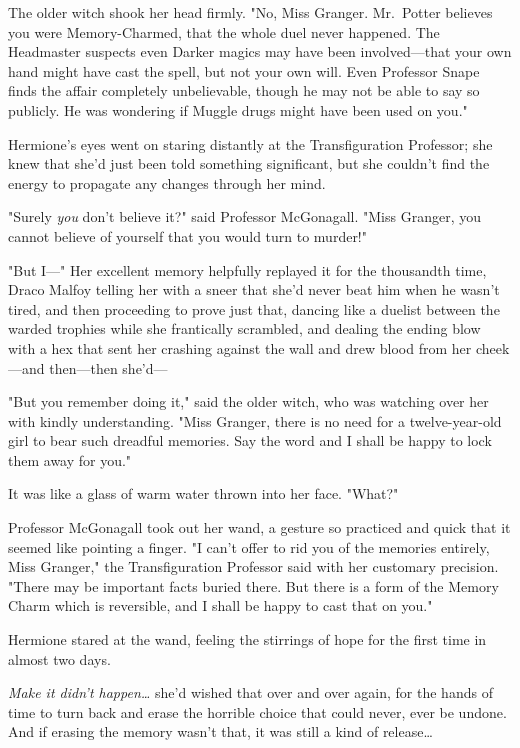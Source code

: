 The older witch shook her head firmly. "No, Miss Granger. Mr.~Potter believes 
you were Memory-Charmed, that the whole duel never happened. The Headmaster 
suspects even Darker magics may have been involved---that your own hand might 
have cast the spell, but not your own will. Even Professor Snape finds the 
affair completely unbelievable, though he may not be able to say so publicly. 
He was wondering if Muggle drugs might have been used on you."

Hermione's eyes went on staring distantly at the Transfiguration Professor; she 
knew that she'd just been told something significant, but she couldn't find the 
energy to propagate any changes through her mind.

"Surely \emph{you} don't believe it?" said Professor McGonagall. "Miss Granger, 
you cannot believe of yourself that you would turn to murder!"

"But I---" Her excellent memory helpfully replayed it for the thousandth time, 
Draco Malfoy telling her with a sneer that she'd never beat him when he wasn't 
tired, and then proceeding to prove just that, dancing like a duelist between 
the warded trophies while she frantically scrambled, and dealing the ending 
blow with a hex that sent her crashing against the wall and drew blood from her 
cheek---and then---then she'd---

"But you remember doing it," said the older witch, who was watching over her 
with kindly understanding. "Miss Granger, there is no need for a 
twelve-year-old girl to bear such dreadful memories. Say the word and I shall 
be happy to lock them away for you."

It was like a glass of warm water thrown into her face. "What?"

Professor McGonagall took out her wand, a gesture so practiced and quick that 
it seemed like pointing a finger. "I can't offer to rid you of the memories 
entirely, Miss Granger," the Transfiguration Professor said with her customary 
precision. "There may be important facts buried there. But there is a form of 
the Memory Charm which is reversible, and I shall be happy to cast that on you."

Hermione stared at the wand, feeling the stirrings of hope for the first time 
in almost two days.

\emph{Make it didn't happen{\ldots}} she'd wished that over and over again, for 
the hands of time to turn back and erase the horrible choice that could never, 
ever be undone. And if erasing the memory wasn't that, it was still a kind of 
release{\ldots}

